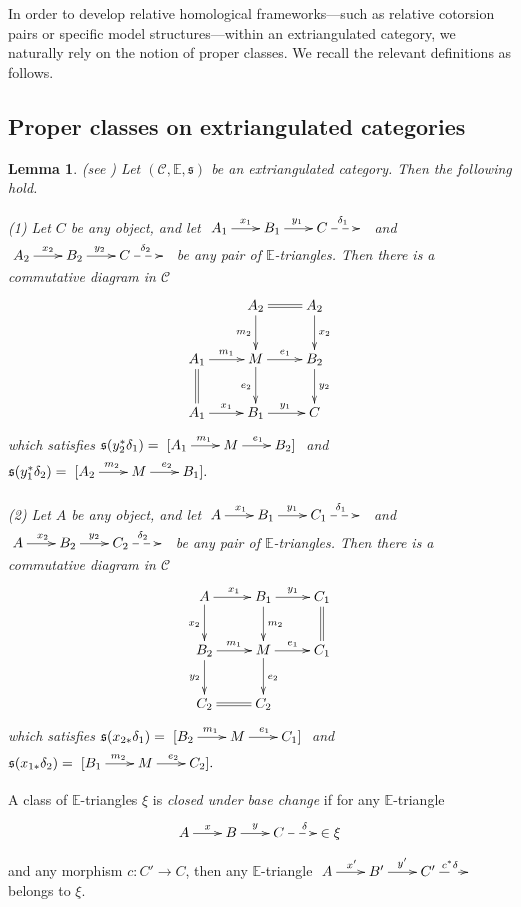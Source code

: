 \documentclass[11pt,a4paper]{amsart}
\numberwithin{equation}{section}
\theoremstyle{plain}
\newtheorem{lem}[thm]{Lemma}
\begin{document}
In order to develop relative homological frameworks—such as relative cotorsion pairs or specific model structures—within an extriangulated category, we naturally rely on the notion of proper classes. We recall the relevant definitions as follows.



\subsection{Proper classes on extriangulated categories}
\begin{lem}\label{lem1} \emph{(see \cite[Proposition 3.15]{NP})} Let $(\mathscr{C}, \mathbb{E},\mathfrak{s})$ be an extriangulated category. Then the following hold.
	
	\emph{(1)} Let $C$ be any object, and let $\xymatrix@C=2em{A_1\ar[r]^{x_1}&B_1\ar[r]^{y_1}&C\ar@{-->}[r]^{\delta_1}&}$ and $\xymatrix@C=2em{A_2\ar[r]^{x_2}&B_2\ar[r]^{y_2}&C\ar@{-->}[r]^{\delta_2}&}$ be any pair of $\mathbb{E}$-triangles. Then there is a commutative diagram
	in $\mathscr{C}$
	$$\xymatrix{
		& A_2\ar[d]_{m_2} \ar@{=}[r] & A_2 \ar[d]^{x_2} \\
		A_1 \ar@{=}[d] \ar[r]^{m_1} & M \ar[d]_{e_2} \ar[r]^{e_1} & B_2\ar[d]^{y_2} \\
		A_1 \ar[r]^{x_1} & B_1\ar[r]^{y_1} & C   }
	$$
	which satisfies $\mathfrak{s}(y^*_2\delta_1)=\xymatrix@C=2em{[A_1\ar[r]^{m_1}&M\ar[r]^{e_1}&B_2]}$ and
	$\mathfrak{s}(y^*_1\delta_2)=\xymatrix@C=2em{[A_2\ar[r]^{m_2}&M\ar[r]^{e_2}&B_1].}$
	
	\emph{(2)} Let $A$ be any object, and let $\xymatrix@C=2em{A\ar[r]^{x_1}&B_1\ar[r]^{y_1}&C_1\ar@{-->}[r]^{\delta_1}&}$ and $\xymatrix@C=2em{A\ar[r]^{x_2}&B_2\ar[r]^{y_2}&C_2\ar@{-->}[r]^{\delta_2}&}$ be any pair of $\mathbb{E}$-triangles. Then there is a commutative diagram
	in $\mathscr{C}$
	$$\xymatrix{
		A\ar[d]_{x_2} \ar[r]^{x_1} & B_1 \ar[d]^{m_2}\ar[r]^{y_1}&C_1\ar@{=}[d] \\
		B_2 \ar[d]_{y_2} \ar[r]^{m_1} & M \ar[d]^{e_2} \ar[r]^{e_1} & C_1 \\
		C_2 \ar@{=}[r] & C_2 &   }
	$$
	which satisfies $\mathfrak{s}(x_{2*}\delta_1)=\xymatrix@C=2em{[B_2\ar[r]^{m_1}&M\ar[r]^{e_1}&C_1]}$ and $\mathfrak{s}(x_{1*}\delta_2)=\xymatrix@C=2em{[B_1\ar[r]^{m_2}&M\ar[r]^{e_2}&C_2].}$
\end{lem}


A class of $\mathbb{E}$-triangles $\xi$ is {\it closed under base change} if for any $\mathbb{E}$-triangle $$\xymatrix@C=2em{A\ar[r]^x&B\ar[r]^y&C\ar@{-->}[r]^{\delta}&\in\xi}$$ and any morphism $c\colon C' \to C$, then any $\mathbb{E}$-triangle  $\xymatrix@C=2em{A\ar[r]^{x'}&B'\ar[r]^{y'}&C'\ar@{-->}[r]^{c^*\delta}&}$ belongs to $\xi$.
\end{document}
